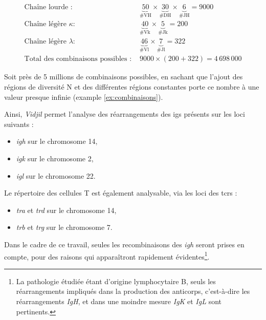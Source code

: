 \begin{examplebox}[label={ex:combinaisons}]
    \begin{equation}
        \begin{aligned}
        \text{Chaîne lourde : } & \underbrace{50}_{\text{\# VH}} \times \underbrace{30}_{\text{\# DH}} \times \underbrace{6}_{\text{\# JH}} = 9000 \\
        \text{Chaîne légère } \kappa : & \underbrace{40}_{\text{\# Vk}} \times \underbrace{5}_{\text{\# Jk}} = 200 \\
        \text{Chaîne légère } \lambda : & \underbrace{46}_{\text{\# Vl}} \times \underbrace{7}_{\text{\# Jl}} = 322 \\
        \text{Total des combinaisons possibles : } & 9000 \times (200 + 322) = 4\,698\,000
        \end{aligned}
    \end{equation}
\end{examplebox}

Soit près de 5 millions de combinaisons possibles, en sachant que l'ajout des régions de diversité N
et des différentes régions constantes porte ce nombre à une valeur presque infinie (example \autoref{ex:combinaisons}).

\vspace{1em}

Ainsi, \textit{Vidjil} permet l'analyse des réarrangements des \glspl{ig} présents sur les loci suivants : 
\begin{itemize}
    \item \textit{\gls{igh}} sur le chromosome 14, 
    \item \textit{\gls{igk}} sur le chromosome 2, 
    \item \textit{\gls{igl}} sur le chromosome 22.
\end{itemize}

\vspace{1em}

Le répertoire des cellules T est également analysable, via les loci des \glspl{tcr} :
\begin{itemize}
    \item \textit{\gls{tra}} et \textit{\gls{trd}} sur le chromosome 14, 
    \item \textit{\gls{trb}} et \textit{\gls{trg}} sur le chromosome 7.
\end{itemize}



Dans le cadre de ce travail, seules les recombinaisons des \textit{\gls{igh}} seront prises en compte, 
pour des raisons qui apparaîtront rapidement évidentes\footnote{La pathologie étudiée étant d'origine lymphocytaire B, 
seuls les réarrangements impliqués dans la production des anticorps, c'est-à-dire les réarrangements \textit{IgH}, et
dans une moindre mesure \textit{IgK} et \textit{IgL} sont pertinents.}.

